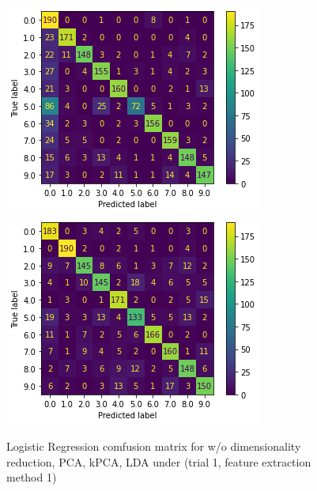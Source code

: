 \documentclass{article}
\begin{document}
\begin{figure}[!htb]
\endminipage\hfill
{}
  \includegraphics[width=\linewidth]{figure/logit_kpca_cm.png}
\endminipage\hfill
{}
  \includegraphics[width=\linewidth]{figure/logit_lda_cm.png}
\endminipage
\caption{Logistic Regression comfusion matrix for w/o dimensionality reduction, PCA, kPCA, LDA under (trial 1, feature extraction method 1)}
\label{logit_cm}
\end{figure}
\end{document}
